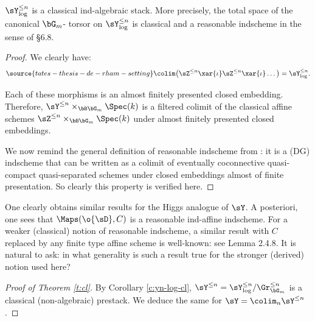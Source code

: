 \begin{cor}
\notready\label{c:yn-log-cl}

$\sY_{\log}^{\leq n}$ is a classical ind-algebraic stack.
More precisely, the total space of the canonical $\bG_m$-
torsor on
$\sY_{\log}^{\leq n}$ is classical and a reasonable indscheme
in the sense of \cite{methods} \S 6.8.

\end{cor}

\begin{proof}

We clearly have:
%
\begin{equation}\label{eq:y-log-colim-iota}
\source{tates-thesis-de-rham-setting}
\colim \big(\sZ^{\leq n} \xar{\iota} \sZ^{\leq n} \xar{\iota } \ldots \big)
= \sY_{\log}^{\leq n}.
\end{equation}

 Each of these morphisms is an
almost finitely presented closed
embedding.
Therefore, $\sY^{\leq n} \times_{\bB \bG_m} \Spec(k)$
is a filtered colimit of the classical affine schemes
$\sZ^{\leq n} \times_{\bB \bG_m} \Spec(k)$ under
almost finitely presented closed
embeddings.

We now remind the general definition of reasonable
indscheme from \cite{methods}:
it is a (DG) indscheme that can be written
as a colimit of eventually coconnective
quasi-compact quasi-separated schemes
under closed embeddings almost of finite presentation.
So clearly this property is verified here.

\end{proof}

\begin{rem}
\notready

One clearly obtains similar results for the Higgs analogue
of $\sY$. A posteriori, one sees that
$\Maps(\o{\sD},C)$ is a reasonable ind-affine indscheme.
For a weaker (classical) notion of reasonable indscheme, a similar
result with $C$ replaced by any finite type affine scheme
is well-known: see \cite{chiral} Lemma 2.4.8. It is natural to ask: in what
generality is such a result true for the stronger
(derived) notion used here?

\end{rem}

\begin{proof}[Proof of Theorem \ref{t:cl}]

By Corollary \ref{c:yn-log-cl},
$\sY^{\leq n} = \sY_{\log}^{\leq n}/\Gr_{\bG_m}^{\leq n}$
is a classical (non-algebraic) prestack.
We deduce the same for $\sY = \colim_n \sY^{\leq n}$.

\end{proof}

